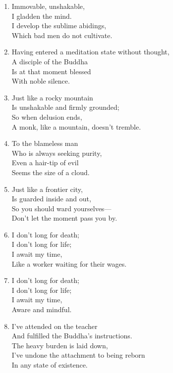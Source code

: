 \documentclass[10pt, openany]{book}
\begin{document}
\begin{enumerate}
\item Immovable, unshakable,\\
I gladden the mind.\\
I develop the sublime abidings,\\
Which bad men do not cultivate.

\item Having entered a meditation state without thought,\\
A disciple of the Buddha\\
Is at that moment blessed\\
With noble silence.

\item Just like a rocky mountain\\
Is unshakable and firmly grounded;\\
So when delusion ends,\\
A monk, like a mountain, doesn’t tremble.

\item To the blameless man\\
Who is always seeking purity,\\
Even a hair-tip of evil\\
Seems the size of a cloud.

\item Just like a frontier city,\\
Is guarded inside and out,\\
So you should ward yourselves—\\
Don’t let the moment pass you by.

\item I don’t long for death;\\
I don’t long for life;\\
I await my time,\\
Like a worker waiting for their wages.

\item I don’t long for death;\\
I don’t long for life;\\
I await my time,\\
Aware and mindful.

\item I’ve attended on the teacher\\
And fulfilled the Buddha’s instructions.\\
The heavy burden is laid down,\\
I’ve undone the attachment to being reborn \\
In any state of existence.


\end{enumerate}
\end{document}
